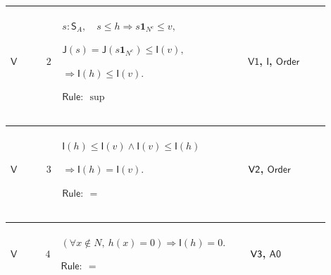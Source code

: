 \documentclass[12pt,reqno]{amsart}
\theoremstyle{blueplain}
\numberwithin{equation}{section}
\begin{document}
{\scriptsize \setlength{\parskip}{0pt}\nointerlineskip
\noindent 
\begin{tabular}{|@{}>{\centering\arraybackslash}m{0.10658\linewidth}|>{\centering\arraybackslash}m{0.03553\linewidth}|>{\centering\arraybackslash}m{0.52105\linewidth}|>{\centering\arraybackslash}m{0.23684\linewidth}|}
\hline
\hypertarget{dct:V2}{$\displaystyle \mathsf{V}$} & $\displaystyle 2$ & $%
\displaystyle s:\mathsf{S}_A,\quad s\le h\Rightarrow s\mathbf{1}_{N^c}\le v,$%
\par$\displaystyle \mathsf{J}(s)=\mathsf{J}(s\mathbf{1}_{N^c})\le\mathsf{I}%
(v),$\par$\displaystyle \Rightarrow\mathsf{I}(h)\le\mathsf{I}(v).$\par$%
\displaystyle \mathsf{Rule}:\ \sup$ & \hyperlink{dct:V1}{$\displaystyle 
\mathsf{V1}$}, \hyperlink{def:I}{$\displaystyle \mathsf{I}$}, \hyperlink{ax:Order}%
{$\displaystyle \mathsf{Order}$} \\ \hline
\end{tabular}%
}

{\scriptsize \setlength{\parskip}{0pt}\nointerlineskip
\noindent 
\begin{tabular}{|@{}>{\centering\arraybackslash}m{0.10658\linewidth}|>{\centering\arraybackslash}m{0.03553\linewidth}|>{\centering\arraybackslash}m{0.52105\linewidth}|>{\centering\arraybackslash}m{0.23684\linewidth}|}
\hline
\hypertarget{dct:V3}{$\displaystyle \mathsf{V}$} & $\displaystyle 3$ & $%
\displaystyle \mathsf{I}(h)\le\mathsf{I}(v)\land\mathsf{I}(v)\le\mathsf{I}(h)
$\par$\displaystyle \Rightarrow\mathsf{I}(h)=\mathsf{I}(v).$\par$%
\displaystyle \mathsf{Rule}:\ =$ & \hyperlink{dct:V2}{$\displaystyle \mathsf{%
V2}$}, \hyperlink{ax:Order}{$\displaystyle \mathsf{Order}$} \\ \hline
\end{tabular}%
}

{\scriptsize \setlength{\parskip}{0pt}\nointerlineskip
\noindent 
\begin{tabular}{|@{}>{\centering\arraybackslash}m{0.10658\linewidth}|>{\centering\arraybackslash}m{0.03553\linewidth}|>{\centering\arraybackslash}m{0.52105\linewidth}|>{\centering\arraybackslash}m{0.23684\linewidth}|}
\hline
\hypertarget{dct:V4}{$\displaystyle \mathsf{V}$} & $\displaystyle 4$ & $%
\displaystyle (\forall x\notin N,\ h(x)=0)\Rightarrow\mathsf{I}(h)=0.$\par$%
\displaystyle \mathsf{Rule}:\ =$ & \hyperlink{dct:V3}{$\displaystyle \mathsf{%
V3}$}, \hyperlink{dct:A0}{$\displaystyle \mathsf{A0}$} \\ \hline
\end{tabular}%
}
\end{document}
